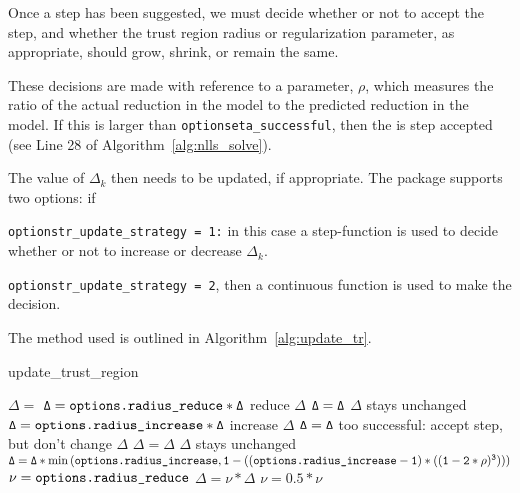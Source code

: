Once a step has been suggested, we must decide whether or not to accept the step, and whether the trust region radius or regularization parameter, as appropriate, should grow, shrink, or remain the same.

These decisions are made with reference to a parameter, $\rho$, which measures the
ratio of the actual reduction in the model to the predicted reduction in the model.
If this is larger than {\tt options\ct eta\_successful}, then the is step accepted (see Line 28 of Algorithm~\ref{alg:nlls_solve}).

The value of $\Delta_k$ then needs to be updated, if appropriate.
The package supports two options: if
\begin{description}
\item  {\tt options\ct tr\_update\_strategy = 1:} in this case a step-function is used to decide whether or not to increase or decrease $\Delta_k$.
\item {\tt options\ct tr\_update\_strategy = 2}, then a continuous function is used to
  make the decision.
\end{description}
The method used is outlined in Algorithm~\ref{alg:update_tr}.

\begin{algorithm}
\caption{update\_trust\_region}
\label{alg:update_tr}
\begin{algorithmic}[1]
   $\Delta = $ 
      \State $\tt \Delta = \text{\tt options.radius\_reduce} * \Delta$
      \Comment reduce $\Delta$
      \State $\tt \Delta = \Delta$
      \Comment $\Delta$ stays unchanged
      \State $\tt \Delta = \text{\tt options.radius\_increase} * \Delta$
      \Comment increase $\Delta$
      \State $\tt \Delta = \Delta$
      \Comment too successful: accept step, but don't change $\Delta$
      \EndIf
    \State [on first call, set $\nu = 2.0$]
        \State $\Delta = \Delta$
        \Comment $\Delta$ stays unchanged
        \State $\tt \Delta = \Delta * \min\left(\text{\tt options.radius\_increase},
          1 - \left( (\text{\tt options.radius\_increase} -1)*((1 - 2*\rho)^3)  \right)\right)$
        \State $\tt \nu = \text{\tt options.radius\_reduce}$
        \State $ \Delta = \nu * \Delta$
        \State $ \nu = 0.5 * \nu$
      \EndIf
    \EndIf
  \end{algorithmic}
\end{algorithm}



